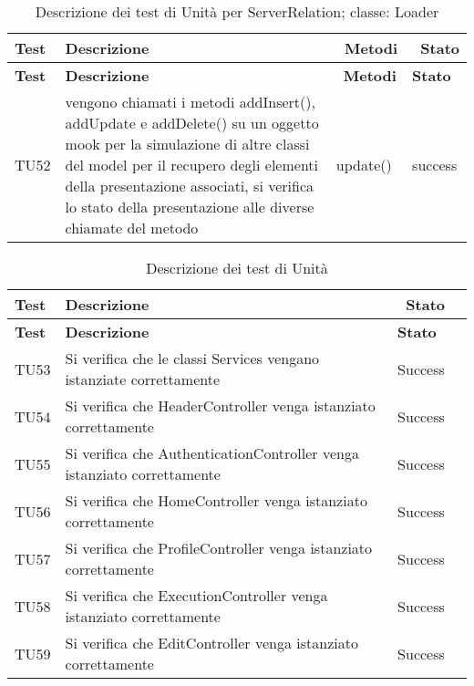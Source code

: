   \begin{longtable} [c]{| p{2cm} | p{6cm} |p{3cm} | p{2cm} |}
		 	 						\caption{Descrizione dei test di Unità per ServerRelation; classe: Loader \label{tab:verTestUnit}}\\
	  		 \hline
	  		 \textbf{Test} & \textbf{Descrizione} & \ \textbf{Metodi} & \ \textbf{Stato} \\
	  		 \hline
	  		 \endfirsthead
	  		 \hline
	  		 \textbf{Test} & \textbf{Descrizione} & \ \textbf{Metodi} & \textbf{Stato} \\
	  		 \hline
		 	 						\endhead
	  		 \hline
	  		 \endfoot
	  		 \hline
	  		 \endlastfoot
 		 TU52 & vengono chiamati i metodi addInsert(), addUpdate e addDelete() su un oggetto mook per la simulazione di altre classi del model per il recupero degli elementi della presentazione associati, si verifica lo stato della presentazione alle diverse chiamate del metodo  & update() & success \\
 		 \end{longtable}
 		 
	 \begin{longtable} [c]{| p{2cm} | p{6cm} |p{3cm} | p{2cm} |}
		 			\caption{Descrizione dei test di Unità \label{tab:verTestUnit}}\\
	 		 \hline
	 		 \textbf{Test} & \textbf{Descrizione} & \ \textbf{Stato} \\
	 		 \hline
	 		 \endfirsthead
	 		 \hline
	 		 \textbf{Test} & \textbf{Descrizione} & \textbf{Stato} \\
	 		 \hline
		 			\endhead
	 		 \hline
	 		 \endfoot
	 		 \hline
	 		 \endlastfoot
          TU53 & Si verifica che le classi Services vengano istanziate correttamente & Success \\
          \hline
          TU54 & Si verifica che HeaderController venga istanziato correttamente & Success \\
          \hline 
          TU55 & Si verifica che AuthenticationController venga istanziato correttamente & Success\\
          \hline
          TU56 & Si verifica che HomeController venga istanziato correttamente & Success \\
          \hline
          TU57 & Si verifica che ProfileController venga istanziato correttamente & Success \\
          \hline
          TU58 & Si verifica che ExecutionController venga istanziato correttamente & Success \\
          \hline
          TU59 & Si verifica che EditController venga istanziato correttamente & Success \\
		 		\end{longtable}
		 		
